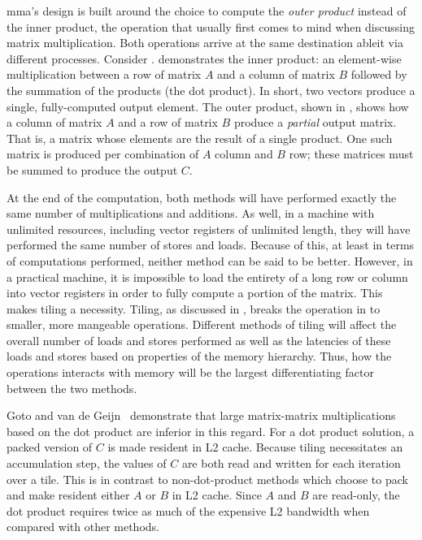 \documentclass[\main/thesis.tex]{subfiles}
\begin{document}
\Gls{mma}'s design is built around the choice to compute the \emph{outer product} instead of the inner product, the operation that usually first comes to mind when discussing matrix multiplication.
Both operations arrive at the same destination ableit via different processes.
Consider .
 demonstrates the inner product: an element-wise multiplication between a row of matrix $A$ and a column of matrix $B$ followed by the summation of the products (\ie the dot product).
In short, two vectors produce a single, fully-computed output element.
The outer product, shown in , shows how a column of matrix $A$ and a row of matrix $B$ produce a \emph{partial} output matrix.
That is, a matrix whose elements are the result of a single product.
One such matrix is produced per combination of $A$ column and $B$ row; these matrices must be summed to produce the output $C$.

At the end of the computation, both methods will have performed exactly the same number of multiplications and additions.
As well, in a machine with unlimited resources, including vector registers of unlimited length, they will have performed the same number of stores and loads.
Because of this, at least in terms of computations performed, neither method can be said to be better.
However, in a practical machine, it is impossible to load the entirety of a long row or column into vector registers in order to fully compute a portion of the matrix.
This makes tiling a necessity.
Tiling, as discussed in , breaks the operation in to smaller, more mangeable operations.
Different methods of tiling will affect the overall number of loads and stores performed as well as the latencies of these loads and stores based on properties of the memory hierarchy.
Thus, how the operations interacts with memory will be the largest differentiating factor between the two methods.

Goto and van de Geijn~\autocite{goto2008anatomy} demonstrate that large matrix-matrix multiplications based on the dot product are inferior in this regard.
For a dot product solution, a packed version of $C$ is made resident in L2 cache.
Because tiling necessitates an accumulation step, the values of $C$ are both read and written for each iteration over a tile.
This is in contrast to non-dot-product methods which choose to pack and make resident either $A$ or $B$ in L2 cache.
Since $A$ and $B$ are read-only, the dot product requires twice as much of the expensive L2 bandwidth when compared with other methods.
\end{document}
